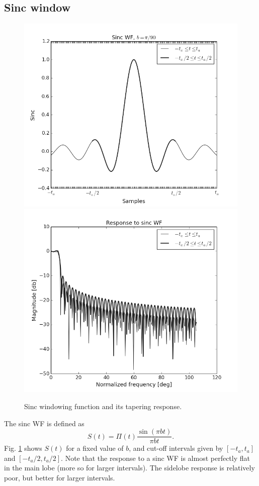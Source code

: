 \documentclass[useAMS,usenatbib]{mn2e}
\begin{document}
\subsection{Sinc window}
\begin{figure}
\includegraphics[width=.5\textwidth]{./Figures/sincgrey.png}%
\includegraphics[width=.5\textwidth]{./Figures/freq_resp_sincgrey.png}
\caption{Sinc windowing function and its tapering response.}\label{fig:wf:sinc}
\end{figure}
The sinc WF is defined as 
\begin{equation}
S(t)= \Pi(t) \frac{\sin(\pi b t)}{\pi b t} .
\end{equation}
Fig. \ref{fig:wf:sinc} shows $S(t)$ for a fixed value of $b$, and cut-off intervals given by $[-t_a,t_a]$ and $[-t_a/2,t_a/2]$.
Note that the response to a sinc WF is almost perfectly flat in the main lobe (more so for larger intervals). The sidelobe response is relatively poor, but better for larger intervals.
\end{document}
